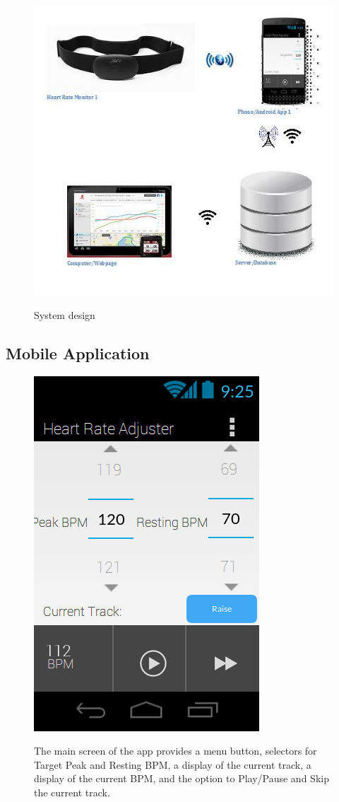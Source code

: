 \documentclass[letterpaper,english, 12pt]{scrreprt}
\begin{document}
\begin{figure}[H]
	\centering
	\includegraphics{img/system.png}\\
	\caption{System design}
\end{figure}

\subsection{Mobile Application}

\begin{figure}[H]
	\centering
	\includegraphics{img/mobile_ui/1.png}\\
	\caption{The main screen of the app provides a menu button, selectors for Target Peak and Resting BPM, a display of the current track, a display of the current BPM, and the option to Play/Pause and Skip the current track.}
\end{figure}
\end{document}

